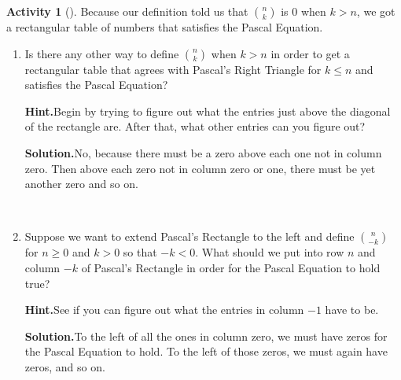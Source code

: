 \documentclass[10pt,]{book}
\theoremstyle{plain}
\theoremstyle{definition}
\newtheorem{activity}[project]{Activity}
\numberwithin{equation}{chapter}
\newcommand{\lt}{<}
\begin{document}
\begin{activity}[]\label{activity-32}
Because our definition told us that \(\binom{n}{k}\) is 0 when \(k>n\), we got a rectangular table of numbers that satisfies the Pascal Equation.%
~\par
\begin{enumerate}[label=(\alph*)]
 \item Is there any other way to define \(\binom{n}{k}\) when \(k>n\) in order to get a rectangular table that agrees with Pascal's Right Triangle for \(k\le n\) and satisfies the Pascal Equation?%
\par\medskip\noindent%
\textbf{Hint.}\quad Begin by trying to figure out what the entries just above the diagonal of the rectangle are. After that, what other entries can you figure out?%
\par\medskip\noindent%
\textbf{Solution.}\quad No, because there must be a zero above each one not in column zero. Then above each zero not in column zero or one, there must be yet another zero and so on.%

~\par
\item Suppose we want to extend Pascal's Rectangle to the left and define \(\binom{n}{-k}\) for \(n\ge 0\) and \(k>0\) so that \(-k\lt 0\). What should we put into row \(n\) and column \(-k\) of Pascal's Rectangle in order for the Pascal Equation to hold true?%
\par\medskip\noindent%
\textbf{Hint.}\quad See if you can figure out what the entries in column \(-1\) have to be.%
\par\medskip\noindent%
\textbf{Solution.}\quad To the left of all the ones in column zero, we must have zeros for the Pascal Equation to hold. To the left of those zeros, we must again have zeros, and so on.%


\end{enumerate}
\end{activity}
\end{document}
